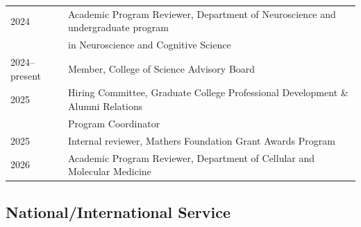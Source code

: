 \documentclass[11pt]{article}
\begin{document}
\begin{longtable}[l]{l l}
2024 & Academic Program Reviewer, Department of Neuroscience and undergraduate program\\ &in Neuroscience and Cognitive Science\\
2024--present & Member, College of Science Advisory Board\\
2025 & Hiring Committee, Graduate College Professional Development \& Alumni Relations\\&  Program Coordinator\\
2025 & Internal reviewer, Mathers Foundation Grant Awards Program\\
2026 & Academic Program Reviewer, Department of Cellular and Molecular Medicine\\
\end{longtable}

\subsection*{National/International Service}
\end{document}
